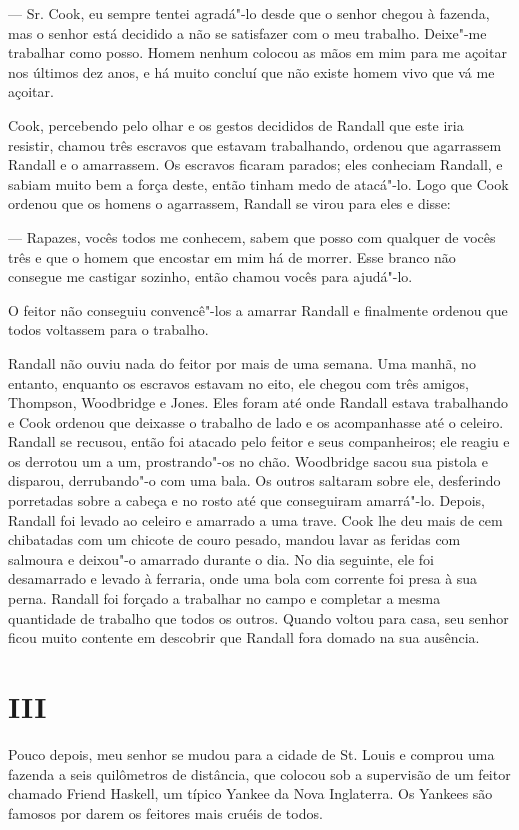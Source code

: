 --- Sr. Cook, eu sempre tentei agradá"-lo desde que o senhor chegou à
fazenda, mas o senhor está decidido a não se satisfazer com o meu
trabalho. Deixe"-me trabalhar como posso. Homem nenhum colocou as mãos em
mim para me açoitar nos últimos dez anos, e há muito concluí que não
existe homem vivo que vá me açoitar.

Cook, percebendo pelo olhar e os gestos decididos de Randall que este
iria resistir, chamou três escravos que estavam trabalhando, ordenou
que agarrassem Randall e o amarrassem. Os escravos ficaram parados; eles
conheciam Randall, e sabiam muito bem a força deste, então tinham medo
de atacá"-lo. Logo que Cook ordenou que os homens o agarrassem, Randall
se virou para eles e disse:

--- Rapazes, vocês todos me conhecem, sabem que posso com qualquer de
vocês três e que o homem que encostar em mim há de morrer. Esse branco
não consegue me castigar sozinho, então chamou vocês para ajudá"-lo.

O feitor não conseguiu convencê"-los a amarrar Randall e finalmente
ordenou que todos voltassem para o trabalho.

Randall não ouviu nada do feitor por mais de uma semana. Uma manhã, no
entanto, enquanto os escravos estavam no eito, ele chegou com três
amigos, Thompson, Woodbridge e Jones. Eles foram até onde Randall estava
trabalhando e Cook ordenou que deixasse o trabalho de lado e os
acompanhasse até o celeiro. Randall se recusou, então foi atacado pelo
feitor e seus companheiros; ele reagiu e os derrotou um a um,
prostrando"-os no chão. Woodbridge sacou sua pistola e disparou,
derrubando"-o com uma bala. Os outros saltaram sobre ele, desferindo
porretadas sobre a cabeça e no rosto até que conseguiram amarrá"-lo.
Depois, Randall foi levado ao celeiro e amarrado a uma trave. Cook lhe
deu mais de cem chibatadas com um chicote de couro pesado, mandou lavar
as feridas com salmoura e deixou"-o amarrado durante o dia. No dia
seguinte, ele foi desamarrado e levado à ferraria, onde uma bola com
corrente foi presa à sua perna. Randall foi forçado a trabalhar no campo
e completar a mesma quantidade de trabalho que todos os outros. Quando
voltou para casa, seu senhor ficou muito contente em descobrir que
Randall fora domado na sua ausência.

\chapter{III}

Pouco depois, meu senhor se mudou para a cidade de St. Louis e comprou
uma fazenda a seis quilômetros de distância, que colocou sob a
supervisão de um feitor chamado Friend Haskell, um típico Yankee da Nova
Inglaterra. Os Yankees são famosos por darem os feitores mais cruéis de
todos.

